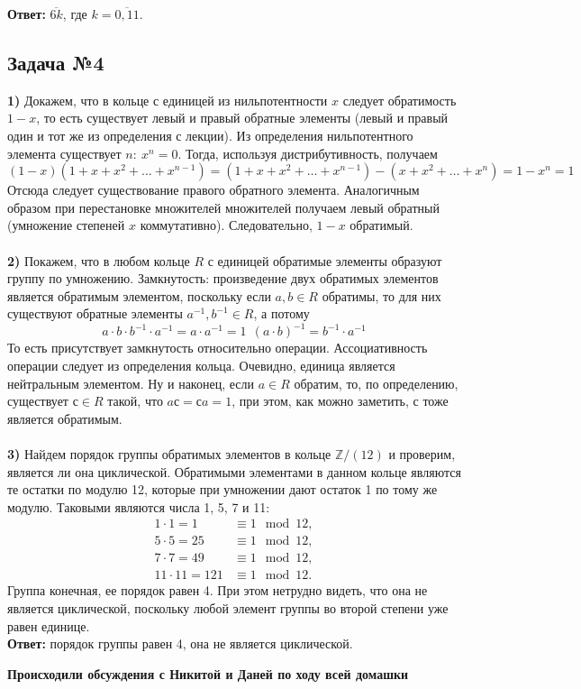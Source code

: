 \documentclass[a4paper,14pt]{article} %
\begin{document}
  \noindent\textbf{Ответ:} $\overline{6k}$, где $k = \overline{0,11}$.
  \subsection{Задача №4}
\textbf{1)}
      Докажем, что в кольце с единицей из нильпотентности $x$ следует обратимость $1-x$, то есть существует левый и правый обратные элементы (левый и правый один и тот же из определения с лекции). Из определения нильпотентного элемента существует $n:~x^n = 0$. Тогда, используя дистрибутивность, получаем
      $$(1 - x)(1 + x + x^2 + \ldots + x^{n-1}) = (1 + x + x^2 + \ldots + x^{n-1}) - (x + x^2 + \ldots + x^n) = 1 - x^n = 1$$
      Отсюда следует существование правого обратного элемента. Аналогичным образом при перестановке множителей множителей получаем левый обратный
      (умножение степеней $x$ коммутативно). Следовательно, $1-x$ обратимый.\\\\
\textbf{2)}
      Покажем, что в любом кольце $R$ с единицей обратимые элементы образуют группу по умножению. Замкнутость: произведение двух обратимых элементов является обратимым элементом, поскольку
      если $a, b \in R$ обратимы, то для них существуют обратные элементы $a^{-1}, b^{-1} \in R$,
      а потому
      $$ a \cdot b \cdot b^{-1} \cdot a^{-1} = a \cdot a^{-1} = 1 ~~ (a \cdot b)^{-1} = b^{-1} \cdot a^{-1} $$
      То есть присутствует замкнутость относительно операции. Ассоциативность операции следует из определения кольца.
      Очевидно, единица является нейтральным элементом.
      Ну и наконец, если $a \in R$ обратим, то, по определению, существует $с \in R$ такой, что
      $aс = сa = 1$, при этом, как можно заметить, $с$ тоже является обратимым.\\\\
\textbf{3)}
      Найдем порядок группы обратимых элементов в кольце $\mathbb{Z} / (12)$ и проверим, является
      ли она циклической. Обратимыми элементами в данном кольце являются те остатки по модулю 12,
      которые при умножении дают остаток 1 по тому же модулю. Таковыми являются числа 1, 5, 7 и 11:
      \begin{align*}
        1 \cdot 1 = 1 &\equiv 1 \mod{12},
        \\
        5 \cdot 5 = 25 &\equiv 1 \mod{12},
        \\
        7 \cdot 7 = 49 &\equiv 1 \mod{12},
        \\
        11 \cdot 11 = 121 &\equiv 1 \mod{12}.
      \end{align*}
      Группа конечная, ее порядок равен 4. При этом нетрудно видеть, что она не
      является циклической, поскольку любой элемент группы во второй степени уже
      равен единице.\\
\textbf{Ответ:} порядок группы равен 4, она не является циклической.

\vspace{1 cm}
\small
\textbf{Происходили обсуждения с Никитой и Даней по ходу всей домашки}
\end{document}
